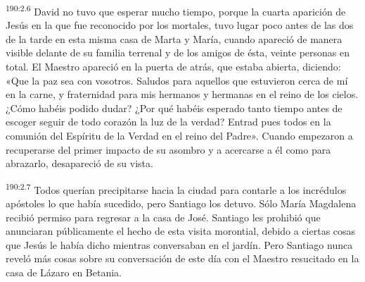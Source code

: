\par
\textsuperscript{190:2.6} David no tuvo que esperar mucho tiempo, porque la cuarta aparición de Jesús en la que fue reconocido por los mortales, tuvo lugar poco antes de las dos de la tarde en esta misma casa de Marta y María, cuando apareció de manera visible delante de su familia terrenal y de los amigos de ésta, veinte personas en total. El Maestro apareció en la puerta de atrás, que estaba abierta, diciendo: «Que la paz sea con vosotros. Saludos para aquellos que estuvieron cerca de mí en la carne, y fraternidad para mis hermanos y hermanas en el reino de los cielos. ¿Cómo habéis podido dudar? ¿Por qué habéis esperado tanto tiempo antes de escoger seguir de todo corazón la luz de la verdad? Entrad pues todos en la comunión del Espíritu de la Verdad en el reino del Padre». Cuando empezaron a recuperarse del primer impacto de su asombro y a acercarse a él como para abrazarlo, desapareció de su vista.

\par
\textsuperscript{190:2.7} Todos querían precipitarse hacia la ciudad para contarle a los incrédulos apóstoles lo que había sucedido, pero Santiago los detuvo. Sólo María Magdalena recibió permiso para regresar a la casa de José. Santiago les prohibió que anunciaran públicamente el hecho de esta visita morontial, debido a ciertas cosas que Jesús le había dicho mientras conversaban en el jardín. Pero Santiago nunca reveló más cosas sobre su conversación de este día con el Maestro resucitado en la casa de Lázaro en Betania.

